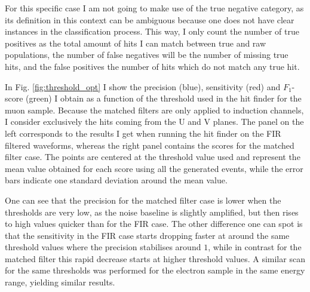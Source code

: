 For this specific case I am not going to make use of the true negative category, as its definition in this context can be ambiguous because one does not have clear instances in the classification process. This way, I only count the number of true positives as the total amount of hits I can match between true and raw populations, the number of false negatives will be the number of missing true hits, and the false positives the number of hits which do not match any true hit.

In Fig. \ref{fig:threshold_opt} I show the precision (blue), sensitivity (red) and $F_{1}$-score (green) I obtain as a function of the threshold used in the hit finder for the muon sample. Because the matched filters are only applied to induction channels, I consider exclusively the hits coming from the U and V planes. The panel on the left corresponds to the results I get when running the hit finder on the FIR filtered waveforms, whereas the right panel contains the scores for the matched filter case. The points are centered at the threshold value used and represent the mean value obtained for each score using all the generated events, while the error bars indicate one standard deviation around the mean value.

One can see that the precision for the matched filter case is lower when the thresholds are very low, as the noise baseline is slightly amplified, but then rises to high values quicker than for the FIR case. The other difference one can spot is that the sensitivity in the FIR case starts dropping faster at around the same threshold values where the precision stabilises around $1$, while in contrast for the matched filter this rapid decrease starts at higher threshold values. A similar scan for the same thresholds was performed for the electron sample in the same energy range, yielding similar results.

